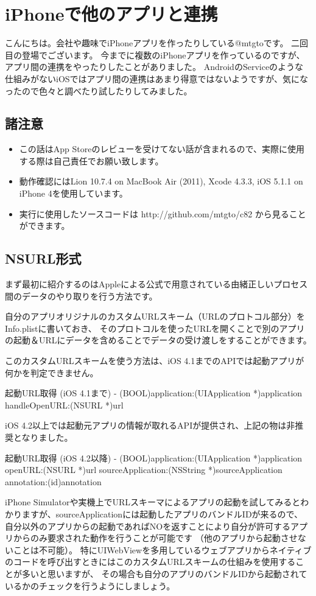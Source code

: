 \section{iPhoneで他のアプリと連携}
こんにちは。会社や趣味でiPhoneアプリを作ったりしている@mtgtoです。
二回目の登場でございます。
今までに複数のiPhoneアプリを作っているのですが、アプリ間の連携をやったりしたことがありました。
AndroidのServiceのような仕組みがないiOSではアプリ間の連携はあまり得意ではないようですが、気になったので色々と調べたり試したりしてみました。

\subsection{諸注意}
\begin{itemize}
  \item この話はApp Storeのレビューを受けてない話が含まれるので、実際に使用する際は自己責任でお願い致します。
  \item 動作確認にはLion 10.7.4 on MacBook Air (2011), Xcode 4.3.3, iOS 5.1.1 on iPhone 4を使用しています。
  \item 実行に使用したソースコードは http://github.com/mtgto/c82 から見ることができます。
\end{itemize}
\subsection{NSURL形式}
まず最初に紹介するのはAppleによる公式で用意されている由緒正しいプロセス間のデータのやり取りを行う方法です。

自分のアプリオリジナルのカスタムURLスキーム（URLのプロトコル部分）をInfo.plistに書いておき、
そのプロトコルを使ったURLを開くことで別のアプリの起動＆URLにデータを含めることでデータの受け渡しをすることができます。

このカスタムURLスキームを使う方法は、iOS 4.1までのAPIでは起動アプリが何かを判定できません。
\begin{itembox}{起動URL取得 (iOS 4.1まで)}
- (BOOL)application:(UIApplication *)application handleOpenURL:(NSURL *)url
\end{itembox}
iOS 4.2以上では起動元アプリの情報が取れるAPIが提供され、上記の物は非推奨となりました。
\begin{itembox}{起動URL取得 (iOS 4.2以降)}
- (BOOL)application:(UIApplication *)application openURL:(NSURL *)url sourceApplication:(NSString *)sourceApplication annotation:(id)annotation
\end{itembox}
iPhone Simulatorや実機上でURLスキーマによるアプリの起動を試してみるとわかりますが、sourceApplicationには起動したアプリのバンドルIDが来るので、
自分以外のアプリからの起動であればNOを返すことにより自分が許可するアプリからのみ要求された動作を行うことが可能です
（他のアプリから起動させないことは不可能）。
特にUIWebViewを多用しているウェブアプリからネイティブのコードを呼び出すときにはこのカスタムURLスキームの仕組みを使用することが多いと思いますが、
その場合も自分のアプリのバンドルIDから起動されているかのチェックを行うようにしましょう。

